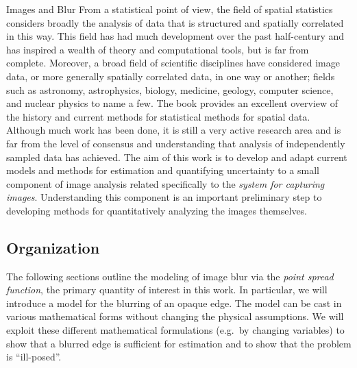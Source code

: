 \begin{chapter}{Images and Blur}
  From a statistical point of view, the field of spatial statistics considers broadly the analysis of data that is structured and spatially correlated in this way.
  This field has had much development over the past half-century and has inspired a wealth of theory and computational tools, but is far from complete.
  Moreover, a broad field of scientific disciplines have considered image data, or more generally spatially correlated data, in one way or another; fields such as astronomy, astrophysics, biology, medicine, geology, computer science, and nuclear physics to name a few.
  The book \citep{cressie1993statistics} provides an excellent overview of the history and current methods for statistical methods for spatial data.
  Although much work has been done, it is still a very active research area and is far from the level of consensus and understanding that analysis of independently sampled data has achieved. 
  The aim of this work is to develop and adapt current models and methods for estimation and quantifying uncertainty to a small component of image analysis related specifically to the \emph{system for capturing images}.
  Understanding this component is an important preliminary step to developing methods for quantitatively analyzing the images themselves.

\subsection{Organization}
  The following sections outline the modeling of image blur via the \emph{point spread function}, the primary quantity of interest in this work.
  In particular, we will introduce a model for the blurring of an opaque edge. 
  The model can be cast in various mathematical forms without changing the physical assumptions.
  We will exploit these different mathematical formulations (e.g.~by changing variables) to show that a blurred edge is sufficient for estimation and to show that the problem is ``ill-posed''.


\end{chapter}
